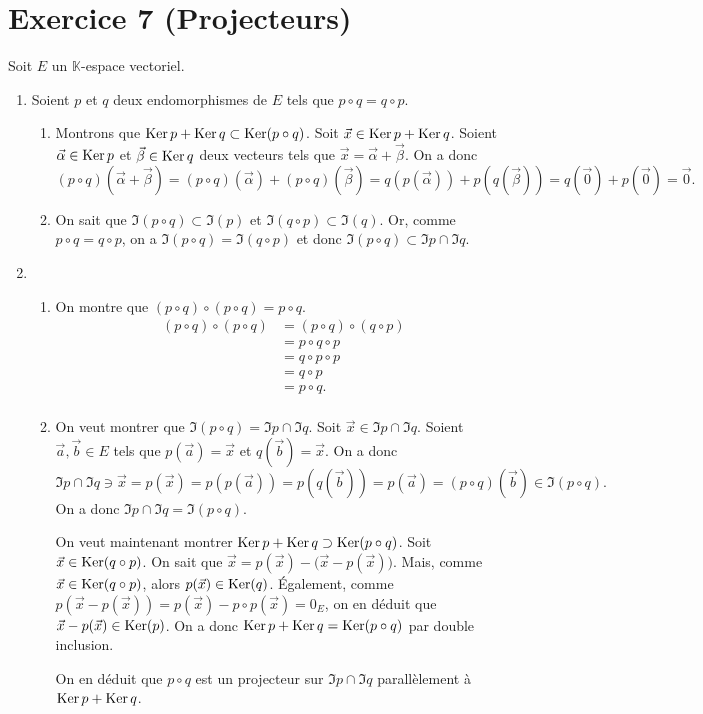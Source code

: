 \section{Exercice 7 (Projecteurs)}

Soit $E$\/ un $\mathds{K}$-espace vectoriel.

\begin{enumerate}
	\item Soient $p$\/ et $q $\/ deux endomorphismes de $E$\/ tels que $p \circ q = q \circ p$.
		\begin{enumerate}
			\item Montrons que $\operatorname{Ker} p + \operatorname{Ker} q \subset \operatorname{Ker} (p \circ q)$. Soit $\vec{x} \in \operatorname{Ker} p + \operatorname{Ker} q$. Soient $\vec{\alpha} \in \operatorname{Ker} p$\/ et $\vec{\beta} \in \operatorname{Ker} q$\/ deux vecteurs tels que $\vec{x} = \vec{\alpha} + \vec{\beta}$. On a donc \[
					(p \circ q)(\vec{\alpha} + \vec{\beta}) = (p \circ q)(\vec{\alpha}) + (p \circ q)(\vec{\beta}) = q(p(\vec{\alpha})) + p(q(\vec{\beta})) = q(\vec{0}) + p(\vec{0}) = \vec{0}
				.\]
			\item On sait que $\Im(p \circ q) \subset \Im(p)$\/ et $\Im(q  \circ p) \subset \Im(q)$. Or, comme $p \circ q = q  \circ p$, on a $\Im(p  \circ q) = \Im(q  \circ p)$\/ et donc $\Im(p  \circ q) \subset \Im p \cap \Im q$.
		\end{enumerate}
	\item
		\begin{enumerate}
			\item On montre que $(p \circ q)  \circ (p  \circ q) = p  \circ q$.
				\begin{align*}
					(p  \circ q)  \circ (p  \circ q) &= (p  \circ q)  \circ (q  \circ p) \\
					&= p  \circ q  \circ p \\
					&= q  \circ p  \circ p \\
					&= q  \circ p \\
					&= p  \circ q. \\
				\end{align*}
			\item On veut montrer que $\Im(p  \circ q) = \Im p \cap \Im q$.
				Soit $\vec{x} \in \Im p \cap \Im q$.
				Soient $\vec{a}, \vec{b} \in E$\/ tels que $p(\vec{a}) = \vec{x}$\/ et $q(\vec{b}) = \vec{x}$. On a donc \[
					\Im p \cap \Im q \ni \vec{x} = p(\vec{x}) = p(p(\vec{a})) = p(q(\vec{b})) = p(\vec{a}) = (p  \circ q)(\vec{b}) \in \Im(p  \circ q)
				.\] On a donc $\Im p \cap \Im q = \Im (p  \circ q)$.
				\bigskip

				On veut maintenant montrer $\operatorname{Ker} p + \operatorname{Ker} q \supset \operatorname{Ker} (p \circ q)$.
				Soit $\vec{x} \in \operatorname{Ker}(q  \circ p)$.
				On sait que $\vec{x} = p(\vec{x}) - \big(\vec{x} - p(\vec{x})\big)$. Mais, comme $\vec{x} \in \operatorname{Ker}(q \circ p)$, alors $p(\vec{x}) \in \operatorname{Ker}(q)$. Également, comme $p(\vec{x} - p(\vec{x})) = p(\vec{x}) - p \circ p(\vec{x}) = 0_E$, on en déduit que $\vec{x} - p(\vec{x}) \in \operatorname{Ker}(p)$. On a donc $\operatorname{Ker} p + \operatorname{Ker} q = \operatorname{Ker} (p \circ q)$\/ par double inclusion.

				On en déduit que $p \circ q$\/ est un projecteur sur $\Im p \cap \Im q$\/ parallèlement à $\operatorname{Ker} p + \operatorname{Ker} q$.
		\end{enumerate}
\end{enumerate}
